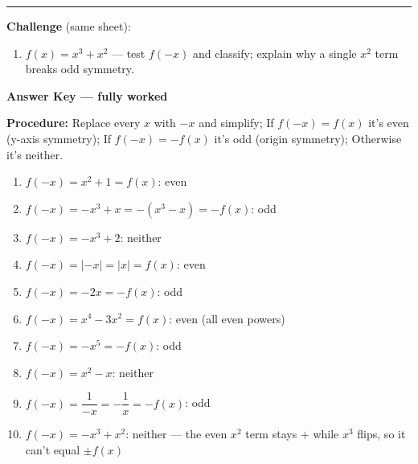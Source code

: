 \documentclass[12pt]{article}
\begin{document}
\vspace{0.2cm}\hrule\vspace{0.3cm}
\textbf{Challenge} (same sheet):\\[4pt]
\begin{enumerate}[label=\textbf{\arabic*.}, start=10, itemsep=2.2cm]
  \item $f(x)=x^{3}+x^{2}$ --- test $f(-x)$ and classify; explain why a single $x^{2}$ term breaks odd symmetry.
\end{enumerate}

\newpage

\begin{center}{\Large \textbf{Answer Key --- fully worked}}\end{center}
\vspace{0.25cm}
\textbf{Procedure:} Replace every $x$ with $-x$ and simplify; If $f(-x)=f(x)$ it's even (y-axis symmetry); If $f(-x)=-f(x)$ it's odd (origin symmetry); Otherwise it's neither.\\[8pt]
\begin{enumerate}[label=\textbf{\arabic*.},itemsep=7pt]
  \item $f(-x)=x^{2}+1=f(x)$: even
  \item $f(-x)=-x^{3}+x=-(x^{3}-x)=-f(x)$: odd
  \item $f(-x)=-x^{3}+2$: neither
  \item $f(-x)=|-x|=|x|=f(x)$: even
  \item $f(-x)=-2x=-f(x)$: odd
  \item $f(-x)=x^{4}-3x^{2}=f(x)$: even (all even powers)
  \item $f(-x)=-x^{5}=-f(x)$: odd
  \item $f(-x)=x^{2}-x$: neither
  \item $f(-x)=\dfrac{1}{-x}=-\dfrac{1}{x}=-f(x)$: odd
  \item $f(-x)=-x^{3}+x^{2}$: neither --- the even $x^{2}$ term stays $+$ while $x^{3}$ flips, so it can't equal $\pm f(x)$
\end{enumerate}
\end{document}
